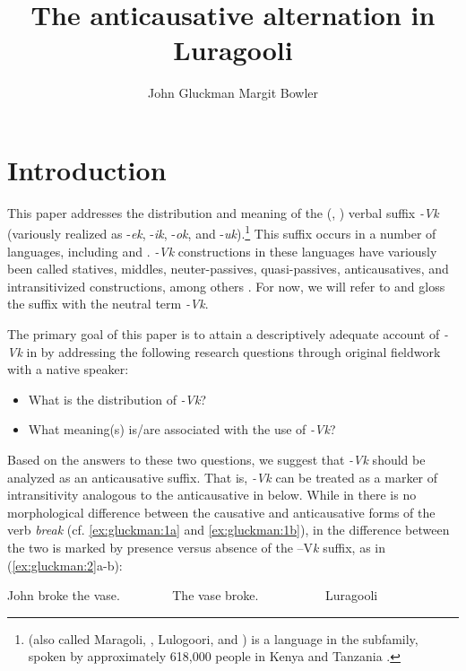 \documentclass[output=paper]{langsci/lanmgscibook}
\title{The anticausative alternation in Luragooli}
\author{%
 John Gluckman\affiliation{UCLA}\lastand 
 Margit Bowler \affiliation{UCLA}
}
\begin{document}
\section{Introduction}\label{sec:gluckman:1}

This paper addresses the distribution and meaning of the  (, ) verbal suffix \textit{-Vk} (variously realized as -\textit{ek}, -\textit{ik}, -\textit{ok}, and -\textit{uk}).\footnote{ (also called Maragoli, , Lulogoori, and ) is a  language in the  subfamily, spoken by approximately 618,000 people in Kenya and Tanzania \citep{LewisEtAl2015}.} This suffix occurs in a number of  languages, including  \citep{Mchombo1993,Simango2009} and  \citep{SeidlDimitriadis2003}. \textit{-Vk} constructions in these languages have variously been called statives, middles, neuter-passives, quasi-passives, anticausatives, and intransitivized constructions, among others \citep{Mchombo1993,Dubinsky1996,SeidlDimitriadis2003,Fernando2013}. For now, we will refer to and gloss the suffix with the neutral term \textit{-Vk}.

The primary goal of this paper is to attain a descriptively adequate account of \textit{-Vk} in  by addressing the following research questions through original fieldwork with a native  speaker:

\begin{itemize}
\item What is the distribution of \textit{-Vk}?
\item What meaning(s) is/are associated with the use of \textit{-Vk}?
\end{itemize}

Based on the answers to these two questions, we suggest that  \textit{-Vk} should be analyzed as an anticausative suffix. That is, \textit{-Vk} can be treated as a marker of intransitivity analogous to the  anticausative in  below. While in  there is no morphological difference between the causative and anticausative forms of the verb \textit{break} (cf. \ref{ex:gluckman:1a} and \ref{ex:gluckman:1b}), in  the difference between the two is marked by presence versus absence of the –V\textit{k} suffix, as in (\ref{ex:gluckman:2}a-b):


\ea\label{ex:gluckman:1} 
\ea\label{ex:gluckman:1a} 
   John broke the vase.~ ~ ~ ~ ~       
 \ex \label{ex:gluckman:1b} 
 The vase broke. ~ ~ ~ ~ ~ ~       
 \z
\z
{}
\ea\label{ex:gluckman:2}{Luragooli}{}{}\\
\ea \label{ex:gluckman:2a}
 
\end{document}
